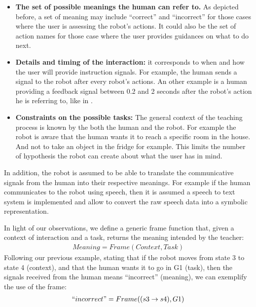 \begin{itemize}

\item \textbf{The set of possible meanings the human can refer to.} As depicted before, a set of meaning may include ``correct'' and ``incorrect'' for those cases where the user is assessing the robot's actions. It could also be the set of action names for those case where the user provides guidances on what to do next.

\item \textbf{Details and timing of the interaction:} it corresponds to when and how the user will provide instruction signals. For example, the human sends a signal to the robot after every robot's actions. An other example is a human providing a feedback signal between 0.2 and 2 seconds after the robot's action he is referring to, like in \cite{knox2009interactively}.

\item \textbf{Constraints on the possible tasks:} The general context of the teaching process is known by the both the human and the robot. For example the robot is aware that the human wants it to reach a specific room in the house. And not to take an object in the fridge for example. This limits the number of hypothesis the robot can create about what the user has in mind.

\end{itemize}

In addition, the robot is assumed to be able to translate the communicative signals from the human into their respective meanings. For example if the human communicates to the robot using speech, then it is assumed a speech to text system is implemented and allow to convert the raw speech data into a symbolic representation.


In light of our observations, we define a generic frame function that, given a context of interaction and a task, returns the meaning intended by the teacher:
%
\begin{eqnarray}
Meaning = Frame(Context, Task)
\end{eqnarray}
%
Following our previous example, stating that if the robot moves from state 3 to state 4 (context), and that the human wants it to go in G1 (task), then the signals received from the human means ``incorrect'' (meaning), we can exemplify the use of the frame:
%
\begin{eqnarray}
``incorrect" = Frame((s3 \rightarrow s4), G1)
\end{eqnarray}





